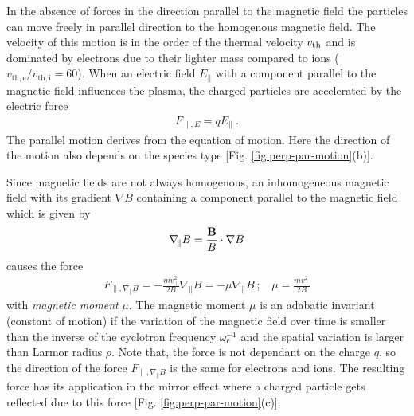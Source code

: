 In the absence of forces in the direction parallel to the magnetic field the particles can move freely in parallel direction to the homogenous magnetic field. The velocity of this motion is in the order of the thermal velocity $v_\mathrm{th}$ and is dominated by electrons due to their lighter mass compared to ions ($v_\mathrm{th,e}/v_\mathrm{th,i} = 60$). When an electric field $E_\parallel$ with a component parallel to the magnetic field influences the plasma, the charged particles are accelerated by the electric force
\begin{gather}
    F_{\parallel,E} = qE_\parallel~.
    \label{eq:forceElectricParallel}
\end{gather}
The parallel motion derives from the equation of motion. Here the direction of the motion also depends on the species type [Fig. \ref{fig:perp-par-motion}(b)].\\\bigskip

Since magnetic fields are not always homogenous, an inhomogeneous magnetic field with its gradient $\nabla B$ containing a component parallel to the magnetic field which is given by
\begin{gather}
    \nabla_{\!\parallel} B = \frac{\boldsymbol{\mathbf{B}}}{B} \cdot \nabla B 
    \label{eq:forceMagneticParallel}
\end{gather}
causes the force
\begin{gather}
    F_{\parallel,\nabla_{\!\parallel} B} = - \frac{mv^2_{\perp}}{2B} \nabla_{\!\parallel} B = - \mu \nabla_{\!\parallel} B~;~~~~\mu = \frac{mv^2_{\perp}}{2B}
    \label{eq:magneticMoment}
\end{gather}
with \textit{magnetic moment} $\mu$. The magnetic moment $\mu$ is an adabatic invariant (constant of motion) if the variation of the magnetic field over time is smaller than the inverse of the cyclotron frequency $\omega^{-1}_\mathrm{c}$ and the spatial variation is larger than Larmor radius $\rho$. Note that, the force is not dependant on the charge $q$, so the direction of the force $ F_{\parallel,\nabla_{\!\parallel} B}$ is the same for electrons and ions. The resulting force has its application in the mirror effect where a charged particle gets reflected due to this force [Fig. \ref{fig:perp-par-motion}(c)].

